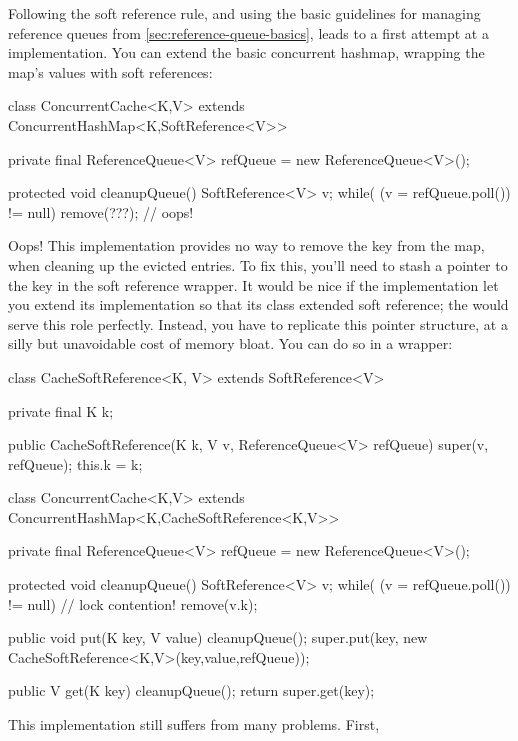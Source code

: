 Following the soft reference rule, and using the basic guidelines for managing
reference queues from \autoref{sec:reference-queue-basics}, leads to a first
attempt at a  implementation. You can extend the basic
concurrent hashmap, wrapping the map's values with soft references:
\begin{shortlisting}
class ConcurrentCache<K,V> extends ConcurrentHashMap<K,SoftReference<V>> {
   private final ReferenceQueue<V> refQueue = new ReferenceQueue<V>();
   
   protected void cleanupQueue() {
      SoftReference<V> v;
      while( (v = refQueue.poll()) != null) {
         remove(???); // oops!
      }
   }
}
\end{shortlisting}
Oops! This implementation provides no way to remove the key from the map, when
cleaning up the evicted entries. To fix this, you'll need to stash a pointer to
the key in the soft reference wrapper. It would be nice if the
 implementation let you extend
its implementation so that its  class extended soft reference;
the  would serve this role perfectly. Instead, you have to
replicate this pointer structure, at a silly but unavoidable cost of memory
bloat. You can do so in a  wrapper:
\begin{shortlisting}
class CacheSoftReference<K, V> extends SoftReference<V> {
   private final K k;
   
   public CacheSoftReference(K k, V v, ReferenceQueue<V> refQueue) {
      super(v, refQueue);
      this.k = k;
   }
}

class ConcurrentCache<K,V> extends ConcurrentHashMap<K,CacheSoftReference<K,V>> {
   private final ReferenceQueue<V> refQueue = new ReferenceQueue<V>();
   
   protected void cleanupQueue() {
      SoftReference<V> v;
      while( (v = refQueue.poll()) != null) { // lock contention!
         remove(v.k);
      }
   }
   
   public void put(K key, V value) {
      cleanupQueue();
      super.put(key, new CacheSoftReference<K,V>(key,value,refQueue));
   }
   
   public V get(K key) {
      cleanupQueue();
      return super.get(key);
   }
}  
\end{shortlisting}
This implementation still suffers from many problems. First, 
